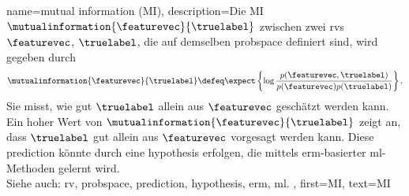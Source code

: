 {{{{
{name={mutual information (MI)},
 	description={Die MI $\mutualinformation{\featurevec}{\truelabel}$ 
 		zwischen zwei \glspl{rv} $\featurevec$, $\truelabel$, die auf demselben \gls{probspace} definiert sind, wird gegeben durch \cite{coverthomas} 
		$$\mutualinformation{\featurevec}{\truelabel} \defeq 
		\expect \left\{ \log \frac{p (\featurevec,\truelabel)}{p(\featurevec)p(\truelabel)} \right\}.$$ 
		Sie misst, wie gut $\truelabel$ allein aus $\featurevec$ geschätzt werden kann. Ein hoher Wert von 
		$\mutualinformation{\featurevec}{\truelabel}$ zeigt an, dass $\truelabel$ gut allein aus $\featurevec$ 
		vorgesagt werden kann. Diese \gls{prediction} könnte durch eine 
		\gls{hypothesis} erfolgen, die mittels \gls{erm}-basierter \gls{ml}-Methoden gelernt wird.
				\\
		Siehe auch: \gls{rv}, \gls{probspace}, \gls{prediction}, \gls{hypothesis}, \gls{erm}, \gls{ml}. }, 
	first={MI}, 
	text={MI} 
}

}}}}

